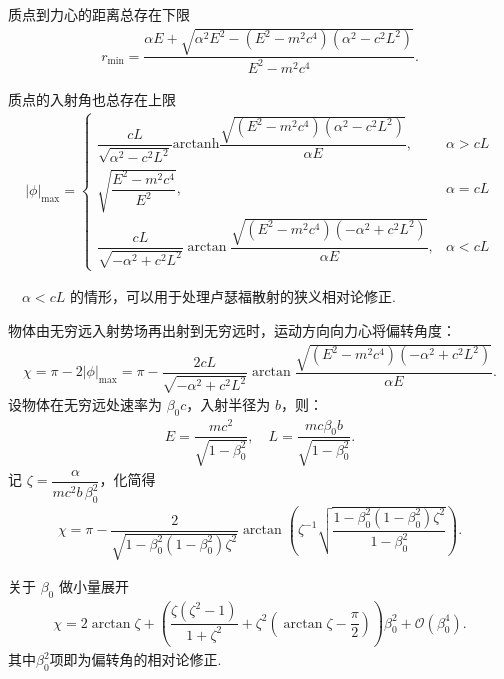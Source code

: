 质点到力心的距离总存在下限
\begin{align*}
	r_{\text{min}} = \dfrac{\alpha E + \sqrt{\alpha^2 E^2 - (E^2 - m^2 c^4) (\alpha^2 - c^2 L^2)}}{E^2 - m^2 c^4}.
\end{align*}

质点的入射角也总存在上限
\begin{align*}
	|\phi|_{\text{max}} =
	\begin{cases}
		\dfrac{c L}{\sqrt{\alpha^2 - c^2 L^2}} \text{arctanh} \dfrac{\sqrt{(E^2 - m^2 c^4) (\alpha^2 - c^2 L^2)}}{\alpha E}, & \alpha > c L \\[10pt]
		\sqrt{\dfrac{E^2 - m^2 c^4}{E^2}},                                                                                   & \alpha = c L \\[10pt]
		\dfrac{c L}{\sqrt{-\alpha^2 + c^2 L^2}} \arctan \dfrac{\sqrt{(E^2 - m^2 c^4) (-\alpha^2 + c^2 L^2)}}{\alpha E},      & \alpha < c L
	\end{cases}
\end{align*}

\begin{exbox}
	\(\quad\alpha < c L\) 的情形，可以用于处理卢瑟福散射的狭义相对论修正.

	物体由无穷远入射势场再出射到无穷远时，运动方向向力心将偏转角度：
	\begin{align*}
		\chi = \pi - 2 |\phi|_{\text{max}} = \pi - \dfrac{2 c L}{\sqrt{-\alpha^2 + c^2 L^2}} \arctan \dfrac{\sqrt{(E^2 - m^2 c^4) (-\alpha^2 + c^2 L^2)}}{\alpha E}.
	\end{align*}
	设物体在无穷远处速率为 \(\beta_0 c\)，入射半径为 \(b\)，则：
	\begin{align*}
		E = \dfrac{m c^2}{\sqrt{1 - \beta_0^2}}, \quad
		L = \dfrac{m c \beta_0 b}{\sqrt{1 - \beta_0^2}}.
	\end{align*}
	记 \(\zeta = \dfrac{\alpha}{m c^2 b \,\beta_0^2}\)，化简得
	\begin{align*}
		\chi = \pi - \dfrac{2}{\sqrt{1 - \beta_0^2 (1 - \beta_0^2) \zeta^2}} \arctan \left( \zeta^{-1} \sqrt{\dfrac{1 - \beta_0^2 (1 - \beta_0^2) \zeta^2}{1 - \beta_0^2}} \right).
	\end{align*}

	关于 \(\beta_0\) 做小量展开
	\begin{align*}
		\chi = 2 \arctan\zeta + \left( \dfrac{\zeta (\zeta^2 - 1)}{1 + \zeta^2} + \zeta^2 \left( \arctan \zeta - \dfrac{\pi}{2} \right) \right) \beta_0^2 + \mathcal{O} (\beta_0^4).
	\end{align*}
	其中\(\beta_0^2\)项即为偏转角的相对论修正.
\end{exbox}

